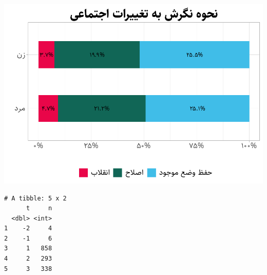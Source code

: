 \documentclass[
]{article}
\begin{document}
\begin{center}\includegraphics{figure/unnamed-chunk-8-1} \end{center}

\begin{verbatim}
# A tibble: 5 x 2
      t     n
  <dbl> <int>
1    -2     4
2    -1     6
3     1   858
4     2   293
5     3   338
\end{verbatim}
\end{document}
